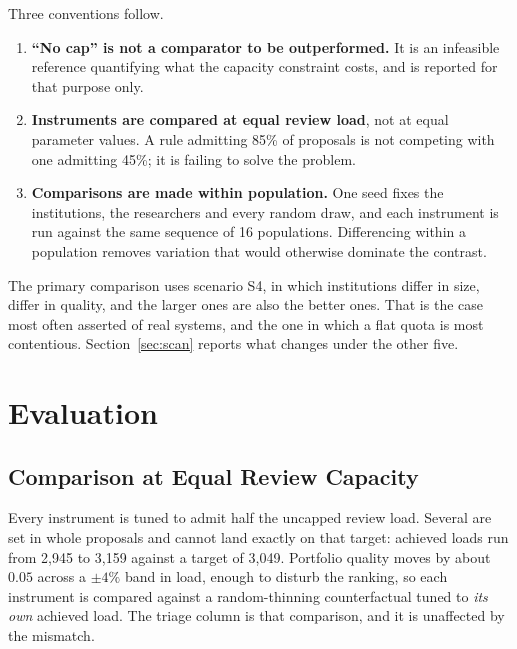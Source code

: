 \documentclass[11pt,a4paper]{article}
\begin{document}
Three conventions follow.

\begin{enumerate}\setlength\itemsep{0.15em}
\item \textbf{``No cap'' is not a comparator to be outperformed.} It is an
      infeasible reference quantifying what the capacity constraint costs, and is
      reported for that purpose only.
\item \textbf{Instruments are compared at equal review load}, not at equal
      parameter values. A rule admitting 85\% of proposals is not competing with
      one admitting 45\%; it is failing to solve the problem.
\item \textbf{Comparisons are made within population.} One seed fixes the institutions,
      the researchers and every random draw, and each instrument is run
      against the same sequence of 16 populations. Differencing within a
      population removes variation that would otherwise dominate the contrast.
\end{enumerate}

The primary comparison uses scenario S4, in which institutions differ in size,
differ in quality, and the larger ones are also the better ones. That is the case
most often asserted of real systems, and the one in which a flat quota is most
contentious. Section~\ref{sec:scan} reports what changes under the other five.

\section{Evaluation}

\subsection{Comparison at Equal Review Capacity}

Every instrument is tuned to admit half the uncapped review load. Several are set
in whole proposals and cannot land exactly on that target: achieved loads run from
2{,}945 to 3{,}159 against a target of 3{,}049. Portfolio quality moves by about
$0.05$ across a $\pm4\%$ band in load, enough to disturb the ranking, so each
instrument is compared against a random-thinning counterfactual tuned to
\emph{its own} achieved load. The triage column is that comparison, and it is
unaffected by the mismatch.
\end{document}

